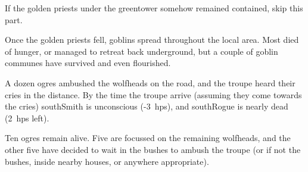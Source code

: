 If the golden priests under the \gls{greentower} somehow remained contained, skip this part.

\begin{exampletext}
  Once the golden priests fell, goblins spread throughout the local area.
  Most died of hunger, or managed to retreat back underground, but a couple of goblin communes have survived and even flourished.
\end{exampletext}

A dozen ogres ambushed the \glspl{wolfhead} on the road, and the troupe heard their cries in the distance.
By the time the troupe arrive (assuming they come towards the cries) \gls{southSmith} is unconscious (-3~\glspl{hp}), and \gls{southRogue} is nearly dead (2~\glspl{hp} left).

Ten ogres remain alive.
Five are focussed on the remaining \glspl{wolfhead}, and the other five have decided to wait in the bushes to ambush the troupe (or if not the bushes, inside nearby houses, or anywhere appropriate).



